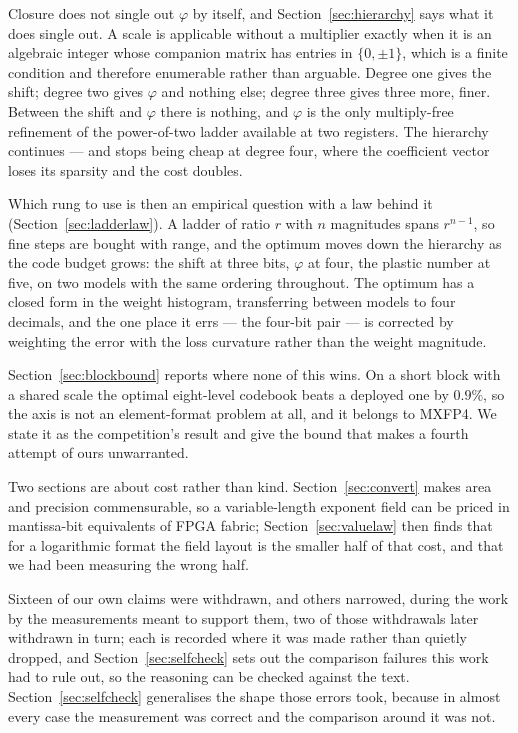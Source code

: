 Closure does not single out $\varphi$ by itself, and Section~\ref{sec:hierarchy}
says what it does single out. A scale is applicable without a multiplier exactly
when it is an algebraic integer whose companion matrix has entries in
$\{0,\pm1\}$, which is a finite condition and therefore enumerable rather than
arguable. Degree one gives the shift; degree two gives $\varphi$ and nothing
else; degree three gives three more, finer. Between the shift and $\varphi$
there is nothing, and $\varphi$ is the only multiply-free refinement of the
power-of-two ladder available at two registers. The hierarchy continues --- and
stops being cheap at degree four, where the coefficient vector loses its
sparsity and the cost doubles.

Which rung to use is then an empirical question with a law behind it
(Section~\ref{sec:ladderlaw}). A ladder of ratio $r$ with $n$ magnitudes spans
$r^{n-1}$, so fine steps are bought with range, and the optimum moves down the
hierarchy as the code budget grows: the shift at three bits, $\varphi$ at four,
the plastic number at five, on two models with the same ordering throughout. The
optimum has a closed form in the weight histogram, transferring between models
to four decimals, and the one place it errs --- the four-bit pair --- is
corrected by weighting the error with the loss curvature rather than the weight
magnitude.

Section~\ref{sec:blockbound} reports where none of this wins. On a short block
with a shared scale the optimal eight-level codebook beats a deployed one by
$0.9\%$, so the axis is not an element-format problem at all, and it belongs to
MXFP4. We state it as the competition's result and give the bound that makes a
fourth attempt of ours unwarranted.

Two sections are about cost rather than kind. Section~\ref{sec:convert} makes
area and precision commensurable, so a variable-length exponent field can be
priced in mantissa-bit equivalents of FPGA fabric; Section~\ref{sec:valuelaw} then finds that
for a logarithmic format the field layout is the smaller half of that cost, and
that we had been measuring the wrong half.

Sixteen of our own claims were withdrawn, and others narrowed, during the work by
the measurements meant to support them, two of those withdrawals later withdrawn
in turn; each is recorded where it was made rather than quietly dropped, and
Section~\ref{sec:selfcheck} sets out the comparison failures this work had to
rule out, so the reasoning
can be checked against the text.
Section~\ref{sec:selfcheck} generalises the shape those errors took, because in
almost every case the measurement was correct and the comparison around it was
not.


